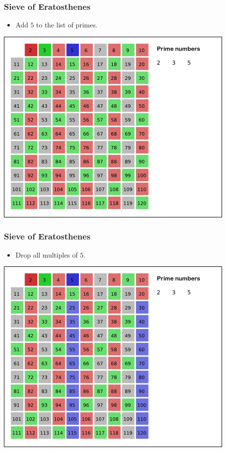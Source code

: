 \documentclass[11pt]{beamer}
\begin{document}
\begin{frame}
  \centering
\frametitle{Sieve of Eratosthenes}
\begin{itemize}
  \item  Add $5$ to  the list of primes.
\end{itemize}
\includegraphics[scale=0.45]{resources/sieve-100.jpg}
\end{frame}

\begin{frame}
\frametitle{Sieve of Eratosthenes}
\centering
\begin{itemize}
  \item Drop all multiples of $5$.
\end{itemize}
    \includegraphics[scale=0.45]{resources/sieve-120.jpg}
\end{frame}
\end{document}
